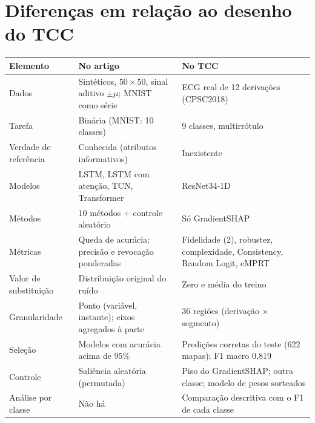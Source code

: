 \documentclass[11pt,a4paper]{article}
\begin{document}
\section{Diferenças em relação ao desenho do TCC}
\begin{center}\small
\begin{tabularx}{\linewidth}{lXX}
\toprule
\textbf{Elemento} & \textbf{No artigo} & \textbf{No TCC} \\
\midrule
Dados & Sintéticos, $50 \times 50$, sinal aditivo $\pm\mu$; MNIST como série & ECG real de 12 derivações (CPSC2018) \\
Tarefa & Binária (MNIST: 10 classes) & 9 classes, multirrótulo \\
Verdade de referência & Conhecida (atributos informativos) & Inexistente \\
Modelos & LSTM, LSTM com atenção, TCN, Transformer & ResNet34-1D \\
Métodos & 10 métodos + controle aleatório & Só GradientSHAP \\
Métricas & Queda de acurácia; precisão e revocação ponderadas & Fidelidade (2), robustez, complexidade, Consistency, Random Logit, eMPRT \\
Valor de substituição & Distribuição original do ruído & Zero e média do treino \\
Granularidade & Ponto (variável, instante); eixos agregados à parte & 36 regiões (derivação $\times$ segmento) \\
Seleção & Modelos com acurácia acima de 95\% & Predições corretas do teste (622 mapas); F1 macro 0,819 \\
Controle & Saliência aleatória (permutada) & Piso do GradientSHAP; outra classe; modelo de pesos sorteados \\
Análise por classe & Não há & Comparação descritiva com o F1 de cada classe \\
\bottomrule
\end{tabularx}
\end{center}
\end{document}
